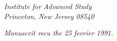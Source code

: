 \documentclass[12pt,a4paper]{article}
\theoremstyle{plain}
\theoremstyle{definition}
\theoremstyle{remark}
\begin{document}
\vspace{1cm}
\begin{flushright}
\textit{Institute for Advanced Study}\\
\textit{Princeton, New Jersey 08540}
\end{flushright}

\vspace{0.5cm}
\begin{flushright}
\textit{Manuscrit recu the 25 fevrier 1991.}
\end{flushright}
\end{document}
